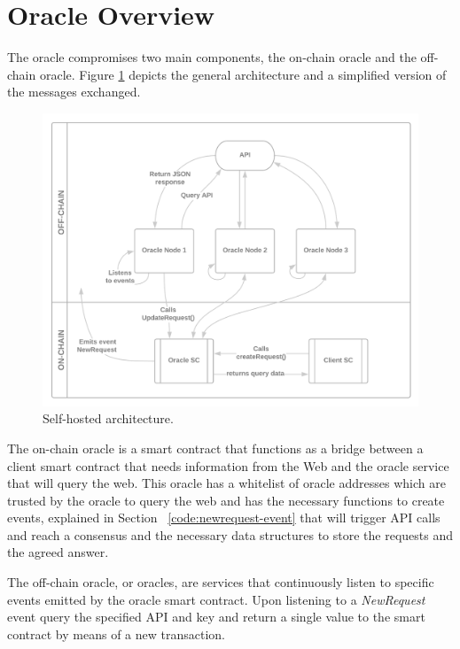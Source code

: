 \section{Oracle Overview}

The oracle compromises two main components, the on-chain oracle and the off-chain oracle. Figure \ref{fig:/figures/self-hosted-architecture} depicts the general architecture and a simplified version of the messages exchanged.

\begin{figure}[t]
    \begin{center}
        \leavevmode
        \includegraphics[width=1\textwidth]{figures/self-hosted-architecture.png}
        \caption{Self-hosted architecture.}
        \label{fig:/figures/self-hosted-architecture}
    \end{center}
\end{figure}


The on-chain oracle is a smart contract that functions as a bridge between a client smart contract that needs information from the Web and the oracle service that will query the web. This oracle has a whitelist of oracle addresses which are trusted by the oracle to query the web and has the necessary functions to create events, explained in Section ~\ref{code:newrequest-event} that will trigger API calls and reach a consensus and the necessary data structures to store the requests and the agreed answer.

The off-chain oracle, or oracles, are services that continuously listen to specific events emitted by the oracle smart contract. Upon listening to a \textit{NewRequest} event query the specified API and key and return a single value to the smart contract by means of a new transaction.

